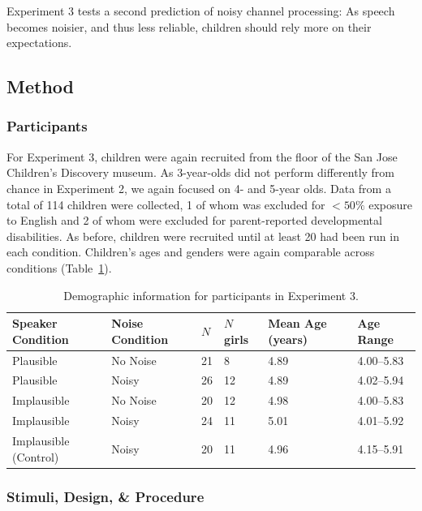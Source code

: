 \documentclass[man,floatsintext]{apa6}
\begin{document}
Experiment 3 tests a second prediction of noisy channel processing: As speech becomes noisier, and thus less reliable, children should rely more on their expectations.

\subsection{Method}

\subsubsection{Participants}

For Experiment 3, children were again recruited from the floor of the San Jose Children's Discovery museum. As 3-year-olds did not perform differently from chance in Experiment 2, we again focused on 4- and 5-year olds. Data from a total of 114 children were collected, 1 of whom was excluded for $<50\%$ exposure to English and 2 of whom were excluded for parent-reported developmental disabilities. As before, children were recruited until at least 20 had been run in each condition. Children's ages and genders were again comparable across conditions (Table~\ref{tab:exp3_demos}).


\begin{table}[tb]
\begin{center}
\begin{tabular}{llllll}
 Speaker Condition & Noise Condition & $N$ & $N$ girls & Mean Age (years) & Age Range\\
  \hline
  Plausible & No Noise & 21 & 8 & 4.89 & 4.00--5.83 \\
  Plausible & Noisy & 26 & 12 & 4.89 & 4.02--5.94 \\
  Implausible & No Noise & 20 & 12 & 4.98 & 4.00--5.83 \\
  Implausible & Noisy & 24 & 11 & 5.01 & 4.01--5.92 \\
  Implausible (Control) & Noisy & 20 & 11 & 4.96 & 4.15--5.91 \\
   \hline
\end{tabular}\end{center}
\vspace{6pt}
\caption{\label{tab:exp3_demos}Demographic information for participants in Experiment 3.}
\end{table}

\subsubsection{Stimuli, Design, \& Procedure}
\end{document}
